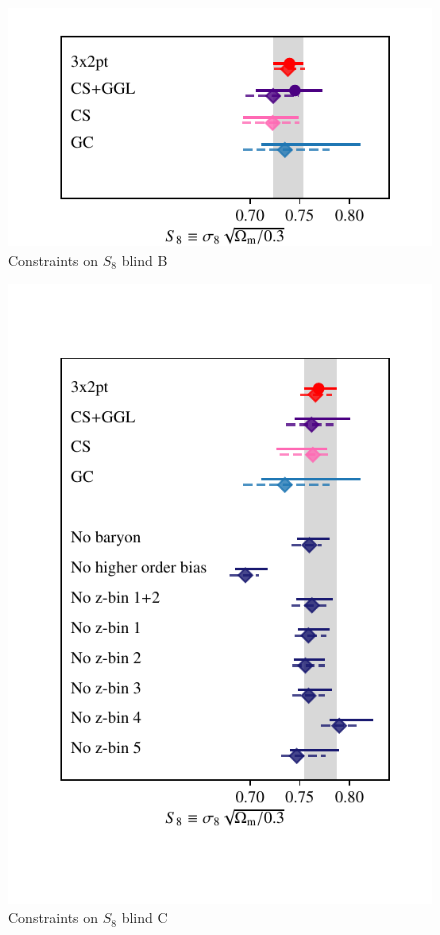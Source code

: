 \begin{figure}
	\begin{center}
		\includegraphics[width=\columnwidth]{Parameter_Plots/systematics/S8_comparison_blindB}
		\caption{Constraints on $S_{8}$ blind B}
		\label{fig:S8comp}
	\end{center}
\end{figure}

\begin{figure}
	\begin{center}
		\includegraphics[width=\columnwidth]{Parameter_Plots/systematics/S8_comparison_blindC}
		\caption{Constraints on $S_{8}$ blind C}
		\label{fig:S8comp}
	\end{center}
\end{figure}


